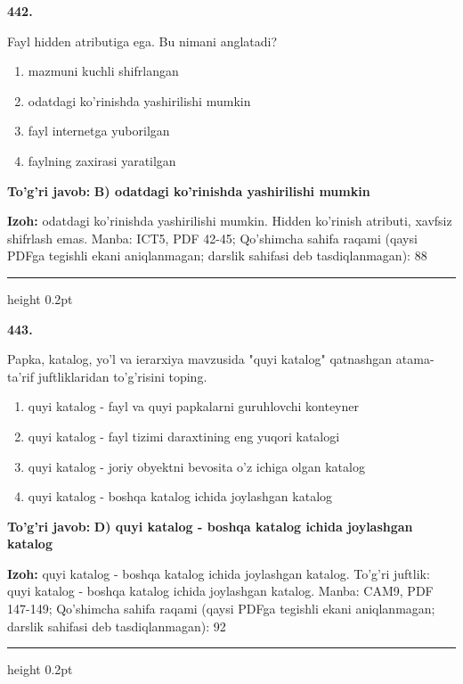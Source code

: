 \documentclass[10pt,a4paper]{article}
\begin{document}
{\bfseries\sffamily\color{ink} 442.}
\par
Fayl hidden atributiga ega. Bu nimani anglatadi?
\begin{enumerate}[label=\Alph*),leftmargin=9mm]
\item mazmuni kuchli shifrlangan
\item odatdagi ko'rinishda yashirilishi mumkin
\item fayl internetga yuborilgan
\item faylning zaxirasi yaratilgan
\end{enumerate}
\begin{tcolorbox}[enhanced,breakable,colback=teal!4,colframe=teal!60!black,boxrule=0.45pt,arc=1.2mm,left=2.7mm,right=2.7mm,top=1.8mm,bottom=1.8mm,before skip=2mm,after skip=2mm]
{\bfseries\sffamily\color{teal}To'g'ri javob:} \textbf{B) odatdagi ko'rinishda yashirilishi mumkin}
\par\smallskip
{\bfseries Izoh:} odatdagi ko'rinishda yashirilishi mumkin. Hidden ko'rinish atributi, xavfsiz shifrlash emas. Manba: ICT5, PDF 42-45; Qo'shimcha sahifa raqami (qaysi PDFga tegishli ekani aniqlanmagan; darslik sahifasi deb tasdiqlanmagan): 88
\end{tcolorbox}
\vspace{2mm}\hrule height 0.2pt\vspace{3mm}

{\bfseries\sffamily\color{ink} 443.}
\par
Papka, katalog, yo'l va ierarxiya mavzusida "quyi katalog" qatnashgan atama-ta'rif juftliklaridan to'g'risini toping.
\begin{enumerate}[label=\Alph*),leftmargin=9mm]
\item quyi katalog - fayl va quyi papkalarni guruhlovchi konteyner
\item quyi katalog - fayl tizimi daraxtining eng yuqori katalogi
\item quyi katalog - joriy obyektni bevosita o'z ichiga olgan katalog
\item quyi katalog - boshqa katalog ichida joylashgan katalog
\end{enumerate}
\begin{tcolorbox}[enhanced,breakable,colback=teal!4,colframe=teal!60!black,boxrule=0.45pt,arc=1.2mm,left=2.7mm,right=2.7mm,top=1.8mm,bottom=1.8mm,before skip=2mm,after skip=2mm]
{\bfseries\sffamily\color{teal}To'g'ri javob:} \textbf{D) quyi katalog - boshqa katalog ichida joylashgan katalog}
\par\smallskip
{\bfseries Izoh:} quyi katalog - boshqa katalog ichida joylashgan katalog. To'g'ri juftlik: quyi katalog - boshqa katalog ichida joylashgan katalog. Manba: CAM9, PDF 147-149; Qo'shimcha sahifa raqami (qaysi PDFga tegishli ekani aniqlanmagan; darslik sahifasi deb tasdiqlanmagan): 92
\end{tcolorbox}
\vspace{2mm}\hrule height 0.2pt\vspace{3mm}
\end{document}
